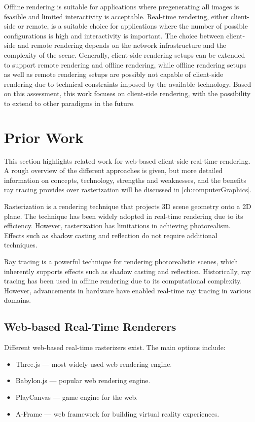 Offline rendering is suitable for applications where pregenerating all images is feasible and limited interactivity is acceptable. Real-time rendering, either client-side or remote, is a suitable choice for applications where the number of possible configurations is high and interactivity is important. The choice between client-side and remote rendering depends on the network infrastructure and the complexity of the scene.
Generally, client-side rendering setups can be extended to support remote rendering and offline rendering, while offline rendering setups as well as remote rendering setups are possibly not capable of client-side rendering due to technical constraints imposed by the available technology. Based on this assessment, this work focuses on client-side rendering, with the possibility to extend to other paradigms in the future.

\section{Prior Work}

This section highlights related work for web-based client-side real-time rendering. A rough overview of the different approaches is given, but more detailed information on concepts, technology, strengths and weaknesses, and the benefits ray tracing provides over rasterization will be discussed in \autoref{ch:computerGraphics}.

Rasterization is a rendering technique that projects 3D scene geometry onto a 2D plane. The technique has been widely adopted in real-time rendering due to its efficiency. However, rasterization has limitations in achieving photorealism. Effects such as shadow casting and reflection do not require additional techniques.

Ray tracing is a powerful technique for rendering photorealistic scenes, which inherently supports effects such as shadow casting and reflection. Historically, ray tracing has been used in offline rendering due to its computational complexity. However, advancements in hardware have enabled real-time ray tracing in various domains.

\subsection*{Web-based Real-Time Renderers}

Different web-based real-time rasterizers exist. The main options include:

\begin{itemize}
  \item {\gls{Three.js}} \cite{threeJSWebsite} — most widely used web rendering engine.
  \item {\gls{Babylon.js}} \cite{babylonJSWebsite} — popular web rendering engine.
  \item {\gls{PlayCanvas}} \cite{playCanvasWebsite} — game engine for the web.
  \item {\gls{A-Frame}} \cite{aFrameWebsite} — web framework for building virtual reality experiences.
\end{itemize}

